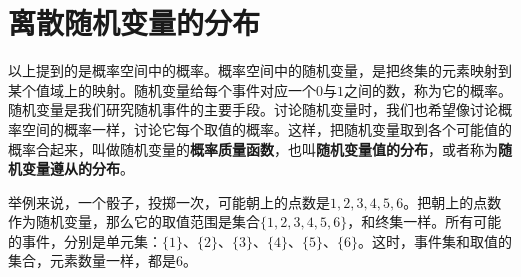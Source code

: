 \documentclass[12pt,UTF8,fontset=none]{ctexbook}
\begin{document}
\section{离散随机变量的分布}

以上提到的是概率空间中的概率。概率空间中的随机变量，是把终集的元素映射到某个值域上的映射。随机变量给每个事件对应一个$0$与$1$之间的数，称为它的概率。随机变量是我们研究随机事件的主要手段。讨论随机变量时，我们也希望像讨论概率空间的概率一样，讨论它每个取值的概率。这样，把随机变量取到各个可能值的概率合起来，叫做随机变量的\textbf{概率质量函数}，也叫\textbf{随机变量值的分布}，或者称为\textbf{随机变量遵从的分布}。

举例来说，一个骰子，投掷一次，可能朝上的点数是$1,2,3,4,5,6$。把朝上的点数作为随机变量，那么它的取值范围是集合$\{1,2,3,4,5,6\}$，和终集一样。所有可能的事件，分别是单元集：$\{1\}$、$\{2\}$、$\{3\}$、$\{4\}$、$\{5\}$、$\{6\}$。这时，事件集和取值的集合，元素数量一样，都是$6$。
\end{document}
